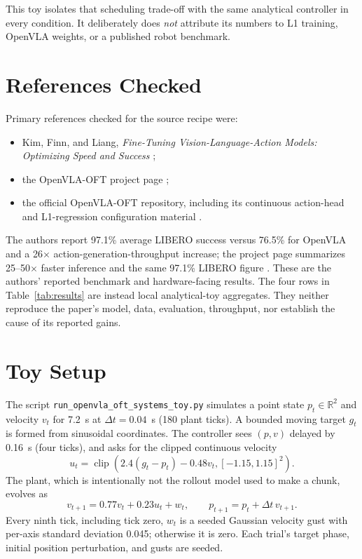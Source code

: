 \documentclass[11pt]{article}
\begin{document}
This toy isolates that scheduling trade-off with the same analytical controller in every condition. It deliberately does \emph{not} attribute its numbers to L1 training, OpenVLA weights, or a published robot benchmark.

\section{References Checked}

Primary references checked for the source recipe were:
\begin{itemize}[leftmargin=1.5em]
  \item Kim, Finn, and Liang, \emph{Fine-Tuning Vision-Language-Action Models: Optimizing Speed and Success} \cite{oftpaper};
  \item the OpenVLA-OFT project page \cite{oftsite};
  \item the official OpenVLA-OFT repository, including its continuous action-head and L1-regression configuration material \cite{oftcode}.
\end{itemize}

The authors report 97.1\% average LIBERO success versus 76.5\% for OpenVLA and a 26$\times$ action-generation-throughput increase; the project page summarizes 25--50$\times$ faster inference and the same 97.1\% LIBERO figure \cite{oftpaper,oftsite}. These are the authors' reported benchmark and hardware-facing results. The four rows in Table~\ref{tab:results} are instead local analytical-toy aggregates. They neither reproduce the paper's model, data, evaluation, throughput, nor establish the cause of its reported gains.

\section{Toy Setup}

The script \texttt{run\_openvla\_oft\_systems\_toy.py} simulates a point state \(p_t\in\mathbb{R}^2\) and velocity \(v_t\) for 7.2~s at \(\Delta t=0.04\)~s (180 plant ticks). A bounded moving target \(g_t\) is formed from sinusoidal coordinates. The controller sees \((p,v)\) delayed by 0.16~s (four ticks), and asks for the clipped continuous velocity
\[
u_t=\operatorname{clip}\!\left(2.4(g_t-p_t)-0.48v_t,[-1.15,1.15]^2\right).
\]
The plant, which is intentionally not the rollout model used to make a chunk, evolves as
\[
v_{t+1}=0.77v_t+0.23u_t+w_t,\qquad p_{t+1}=p_t+\Delta t\,v_{t+1}.
\]
Every ninth tick, including tick zero, \(w_t\) is a seeded Gaussian velocity gust with per-axis standard deviation 0.045; otherwise it is zero. Each trial's target phase, initial position perturbation, and gusts are seeded.
\end{document}
